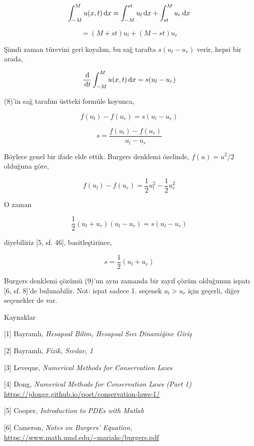 \documentclass[12pt,fleqn]{article}\usepackage{../../common}
\begin{document}
$$
\int_{-M}^{M} u(x,t) \,\mathrm{d} x =
\int_{-M}^{st} u_l \,\mathrm{d} x + 
\int_{st}^{M} u_r \,\mathrm{d} x
$$

$$
= (M+st)u_l + (M-st)u_r
$$

Şimdi zaman türevini geri koyalım, bu sağ tarafta $s(u_l-u_r)$ verir, hepsi
bir arada,

$$
\frac{\,\mathrm{d}}{\,\mathrm{d} t} \int_{-M}^{M} u(x,t) \,\mathrm{d} x = s(u_l-u_r)
$$

(8)'in sağ tarafını üstteki formüle koyunca,

$$
f(u_l) - f(u_r) = s(u_l-u_r)
$$

$$
s = \frac{f(u_l) - f(u_r)}{u_l-u_r}
$$

Böylece genel bir ifade elde ettik. Burgers denklemi özelinde,
$f(u) = u^2 / 2$ olduğuna göre,

$$
f(u_l) - f(u_r) = \frac{1}{2} u_l^2 -  \frac{1}{2} u_r^2
$$

O zaman

$$
\frac{1}{2} (u_l + u_r)(u_l - u_r) = s(u_l-u_r)
$$

diyebiliriz [5, sf. 46], basitleştirince,

$$
s = \frac{1}{2} (u_l + u_r)
$$

Burgers denklemi çözümü (9)'un aynı zamanda bir zayıf çözüm olduğunun ispatı
[6, sf. 8]'de bulunabilir. Not: ispat sadece 1. seçenek $u_l > u_r$ için
geçerli, diğer seçenekler de var.

Kaynaklar

[1] Bayramlı, {\em Hesapsal Bilim, Hesapsal Sıvı Dinamiğine Giriş}

[2] Bayramlı, {\em Fizik, Sıvılar, 1}

[3] Leveque, {\em Numerical Methods for Conservation Laws}

[4] Dong, {\em Numerical Methods for Conservation Laws (Part 1)}
    \url{https://jdongg.github.io/post/conservation-laws-1/}

[5] Cooper, {\em Introduction to PDEs with Matlab}

[6] Cameron, {\em Notes on Burgers' Equation},
    \url{https://www.math.umd.edu/~mariakc/burgers.pdf}
\end{document}
